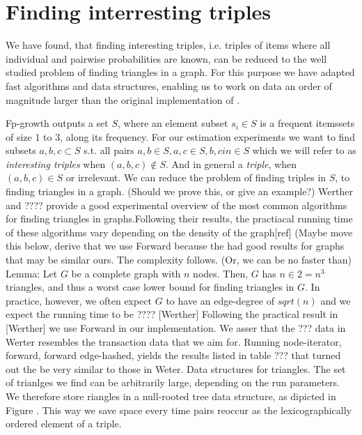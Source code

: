 \documentclass{acm_proc_article-sp}
\begin{document}
\section{Finding interresting triples}

We have found, that finding interesting triples, i.e. triples of items where all individual and pairwise probabilities are known, can be reduced to the well studied problem of finding triangles in a graph. For this purpose we have adapted fast algorithms and data structures, enabling us to work on data an order of magnitude larger than the original implementation of \cite{rasmus}.

Fp-growth outputs a set $S$, where an element subset $s_i \in S$ is a frequent itemssets of size 1 to 3, along its frequency. For our estimation experiments we want to find subsets ${a,b,c \subset S}$ s.t. all pairs ${a,b \in S, a,c \in S, b,c in \in S}$ which we will refer to as {\it interesting triples} when $(a,b,c) \notin S$. And in general a {\it triple}, when $(a,b,c) \in S$ or irrelevant. We can reduce the problem of finding triples in $S$, to finding triangles in a graph. (Should we prove this, or give an example?) Werther and ???? provide a good experimental overview of the most common algorithms for finding triangles in graphs.Following their results, the practiacal running time of these algorithms vary depending on the density of the graph[ref] (Maybe move this below, derive that we use Forward because the had good results for graphs that may be similar ours. The complexity follows. (Or, we can be no faster than) 
Lemma: Let $G$ be a complete graph with $n$ nodes. Then, $G$ has $n \in 2=n^3$ triangles, and thus a worst case lower bound for finding triangles in $G$. 
In practice, however, we often expect $G$ to have an edge-degree of $sqrt(n)$ and we expect the running time to be ???? [Werther]
Following the practical result in [Werther] we use Forward in our implementation. We asser that the ??? data in Werter resembles the transaction data that we aim for. Running node-iterator, forward, forward edge-hashed, yields the results listed in table ??? that turned out the be very similar to those in Weter. 
Data structures for triangles. The set of trianlges we find can be arbitrarily large, depending on the run parameters. We therefore store riangles in a null-rooted tree data structure, as dipicted in Figure . This way we save space every time pairs reoccur as the lexicographically ordered element of a triple.
\end{document}
